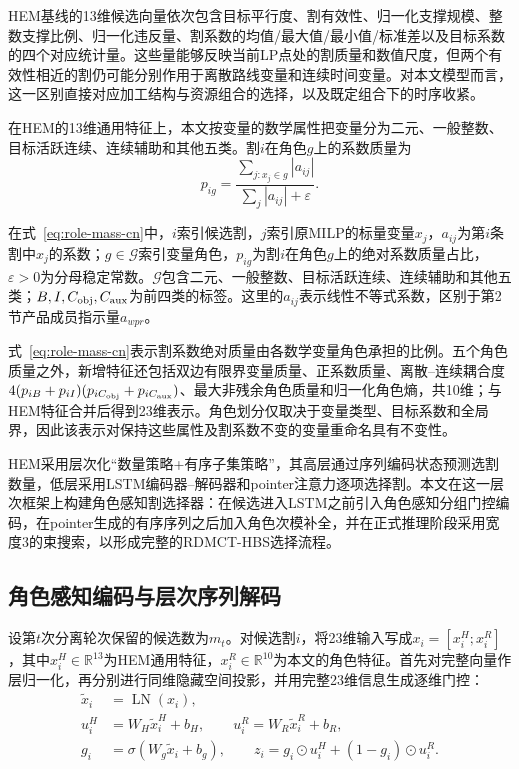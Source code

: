 \documentclass[final,5p,times,twocolumn]{elsarticle}
\begin{document}
HEM基线的13维候选向量依次包含目标平行度、割有效性、归一化支撑规模、整数支撑比例、归一化违反量、割系数的均值/最大值/最小值/标准差以及目标系数的四个对应统计量。这些量能够反映当前LP点处的割质量和数值尺度，但两个有效性相近的割仍可能分别作用于离散路线变量和连续时间变量。对本文模型而言，这一区别直接对应加工结构与资源组合的选择，以及既定组合下的时序收紧。

在HEM的13维通用特征上，本文按变量的数学属性把变量分为二元、一般整数、目标活跃连续、连续辅助和其他五类。割$i$在角色$g$上的系数质量为
\begin{equation}
p_{ig}=\frac{\sum_{j:x_j\in g}|a_{ij}|}{\sum_j|a_{ij}|+\varepsilon}.
\label{eq:role-mass-cn}
\end{equation}

在式~\eqref{eq:role-mass-cn}中，$i$索引候选割，$j$索引原MILP的标量变量$x_j$，$a_{ij}$为第$i$条割中$x_j$的系数；$g\in\mathcal G$索引变量角色，$p_{ig}$为割$i$在角色$g$上的绝对系数质量占比，$\varepsilon>0$为分母稳定常数。$\mathcal G$包含二元、一般整数、目标活跃连续、连续辅助和其他五类；$B,I,C_{\rm obj},C_{\rm aux}$为前四类的标签。这里的$a_{ij}$表示线性不等式系数，区别于第2节产品成员指示量$a_{wpr}$。


式~\eqref{eq:role-mass-cn}表示割系数绝对质量由各数学变量角色承担的比例。五个角色质量之外，新增特征还包括双边有限界变量质量、正系数质量、离散--连续耦合度$4(p_{iB}+p_{iI})(p_{iC_{\rm obj}}+p_{iC_{\rm aux}})$、最大非残余角色质量和归一化角色熵，共10维；与HEM特征合并后得到23维表示。角色划分仅取决于变量类型、目标系数和全局界，因此该表示对保持这些属性及割系数不变的变量重命名具有不变性。

HEM采用层次化“数量策略+有序子集策略”，其高层通过序列编码状态预测选割数量，低层采用LSTM编码器--解码器和pointer注意力逐项选择割\citep{wang2023hem,vinyals2015pointer}。本文在这一层次框架上构建角色感知割选择器：在候选进入LSTM之前引入角色感知分组门控编码，在pointer生成的有序序列之后加入角色次模补全，并在正式推理阶段采用宽度3的束搜索，以形成完整的RDMCT-HBS选择流程。


\subsection{角色感知编码与层次序列解码}

设第$t$次分离轮次保留的候选数为$m_t$。对候选割$i$，将23维输入写成$x_i=[x_i^{H};x_i^{R}]$，其中$x_i^{H}\in\mathbb R^{13}$为HEM通用特征，$x_i^{R}\in\mathbb R^{10}$为本文的角色特征。首先对完整向量作层归一化，再分别进行同维隐藏空间投影，并用完整23维信息生成逐维门控：
\begin{equation}
\begin{aligned}
\widetilde x_i&=\operatorname{LN}(x_i),\\
u_i^{H}&=W_H\widetilde x_i^{H}+b_H,\qquad
u_i^{R}=W_R\widetilde x_i^{R}+b_R,\\
g_i&=\sigma(W_g\widetilde x_i+b_g),\qquad
z_i=g_i\odot u_i^{H}+(1-g_i)\odot u_i^{R}.
\end{aligned}
\label{eq:gated-encoding-cn}
\end{equation}
\end{document}
